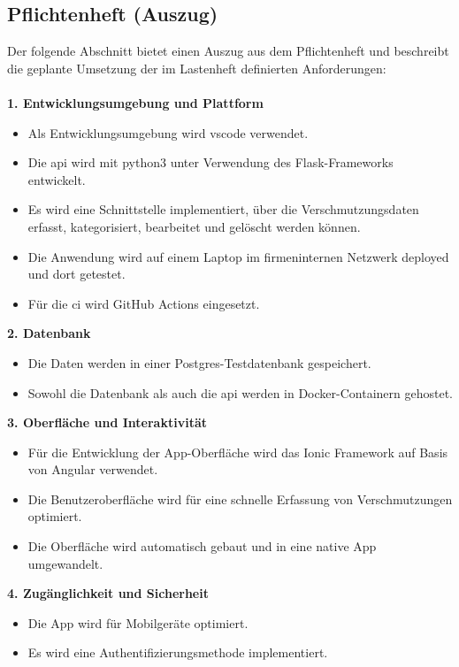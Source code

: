 \documentclass[a4paper,12pt]{article}
\begin{document}
\clearpage
\subsection{Pflichtenheft (Auszug)}
\label{sec:pflichtenheft}

Der folgende Abschnitt bietet einen Auszug aus dem Pflichtenheft und beschreibt die geplante Umsetzung der im Lastenheft definierten Anforderungen:\\
\\
\noindent\textbf{1. Entwicklungsumgebung und Plattform}
\begin{itemize}
    \item Als Entwicklungsumgebung wird \acrshort{vscode} verwendet.
    \item Die \acrshort{api} wird mit \acrshort{python3} unter Verwendung des Flask-Frameworks entwickelt.
    \item Es wird eine Schnittstelle implementiert, über die Verschmutzungsdaten erfasst, kategorisiert, bearbeitet und gelöscht werden können.
    \item Die Anwendung wird auf einem Laptop im firmeninternen Netzwerk deployed und dort getestet.
    \item Für die \acrshort{ci} wird GitHub Actions eingesetzt.
\end{itemize}

\noindent\textbf{2. Datenbank}
\begin{itemize}
    \item Die Daten werden in einer Postgres-Testdatenbank gespeichert.
    \item Sowohl die Datenbank als auch die \acrshort{api} werden in Docker-Containern gehostet.
\end{itemize}

\noindent\textbf{3. Oberfläche und Interaktivität}
\begin{itemize}
    \item Für die Entwicklung der App-Oberfläche wird das Ionic Framework auf Basis von Angular verwendet.
    \item Die Benutzeroberfläche wird für eine schnelle Erfassung von Verschmutzungen optimiert.
    \item Die Oberfläche wird automatisch gebaut und in eine native App umgewandelt.
\end{itemize}

\noindent\textbf{4. Zugänglichkeit und Sicherheit}
\begin{itemize}
    \item Die App wird für Mobilgeräte optimiert.
    \item Es wird eine Authentifizierungsmethode implementiert.
\end{itemize}
\end{document}
